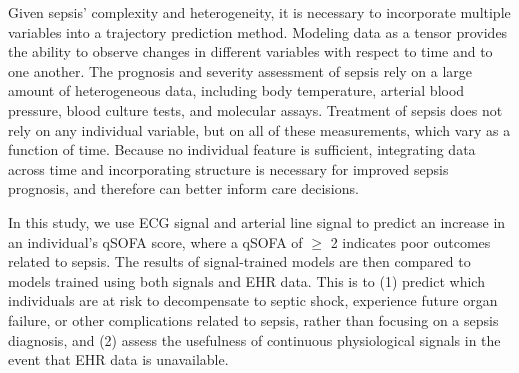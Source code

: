 Given sepsis' complexity and heterogeneity, it is necessary to incorporate multiple variables into a trajectory prediction method. Modeling data as a tensor provides the ability to observe changes in different variables with respect to time and to one another. The prognosis and severity assessment of sepsis rely on a large amount of heterogeneous data, including body temperature, arterial blood pressure, blood culture tests, and molecular assays. Treatment of sepsis does not rely on any individual variable, but on all of these measurements, which vary as a function of time. Because no individual feature is sufficient, integrating data across time and incorporating structure is necessary for improved sepsis prognosis, and therefore can better inform care decisions.

In this study, we use ECG signal and arterial line signal to predict an increase in an individual's qSOFA score, where a qSOFA of $\geq$ 2 indicates poor outcomes related to sepsis. The results of signal-trained models are then compared to models trained using both signals and EHR data. This is to (1) predict which individuals are at risk to decompensate to septic shock, experience future organ failure, or other complications related to sepsis, rather than focusing on a sepsis diagnosis, and (2) assess the usefulness of continuous physiological signals in the event that EHR data is unavailable. 